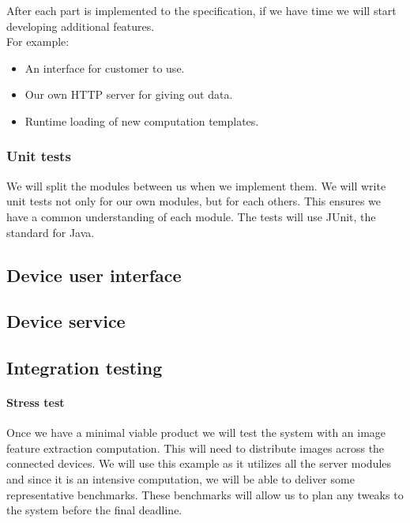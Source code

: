 \documentclass[
  twoside,
  10pt, a4paper
]{article}
\begin{document}
After each part is implemented to the specification, if we have time we will start developing additional features.\\
For example:
\begin{itemize}
\item An interface for customer to use.
\item Our own HTTP server for giving out data.
\item Runtime loading of new computation templates.
\end{itemize}

\subsubsection{Unit tests}

We will split the modules between us when we implement them. We will write unit tests not only for our own modules, but for each others.
This ensures we have a common understanding of each module. The tests will use JUnit, the standard for Java.







\subsection{Device user interface}


\subsection{Device service}


\subsection{Integration testing}
\paragraph{Stress test}

Once we have a minimal viable product we will test the system with an image feature extraction computation. This will need to distribute images across the connected devices.
We will use this example as it utilizes all the server modules and since it is an intensive computation, we will be able to deliver some representative benchmarks.
These benchmarks will allow us to plan any tweaks to the system before the final deadline.
\end{document}
